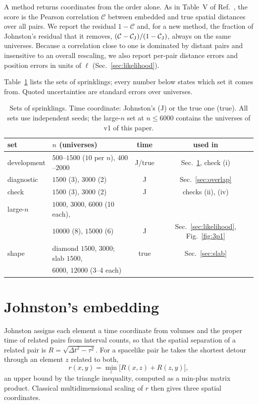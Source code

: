 \documentclass[prd,twocolumn,superscriptaddress,nofootinbib,amsmath,amssymb,floatfix]{revtex4-2}
\begin{document}
A method returns coordinates from the order alone. As in Table~V of Ref.~\cite{Johnston25}, the score is the Pearson correlation $\mathcal C$ between embedded and true spatial distances over all pairs. We report the residual $1-\mathcal C$ and, for a new method, the fraction of Johnston's residual that it removes, $(\mathcal C-\mathcal C_{\rm J})/(1-\mathcal C_{\rm J})$, always on the same universes. Because a correlation close to one is dominated by distant pairs and insensitive to an overall rescaling, we also report per-pair distance errors and position errors in units of $\ell$ (Sec.~\ref{sec:likelihood}).

Table~\ref{tab:sets} lists the sets of sprinklings; every number below states which set it comes from. Quoted uncertainties are standard errors over universes.

\begin{table}[t]
\caption{Sets of sprinklings. Time coordinate: Johnston's (J) or the true one (true). All sets use independent seeds; the large-$n$ set at $n\le6000$ contains the universes of v1 of this paper.}
\label{tab:sets}
\begin{ruledtabular}
\begin{tabular}{llcc}
set & $n$ (universes) & time & used in\\
\hline
development & $500$--$1500$ ($10$ per $n$), $400$--$2000$ & J/true & Sec.~\ref{sec:johnston}, check (i)\\
diagnostic & $1500$ (3), $3000$ (2) & J & Sec.~\ref{sec:overlap}\\
check & $1500$ (3), $3000$ (2) & J & checks (ii), (iv)\\
large-$n$ & $1000$, $3000$, $6000$ (10 each),\\
 & $10000$ (8), $15000$ (6) & J & Sec.~\ref{sec:likelihood}, Fig.~\ref{fig:3p1}\\
shape & diamond $1500$, $3000$; slab $1500$, & true & Sec.~\ref{sec:slab}\\
 & $6000$, $12000$ (3--4 each) & & \\
\end{tabular}
\end{ruledtabular}
\end{table}

\section{Johnston's embedding}\label{sec:johnston}
Johnston assigns each element a time coordinate from volumes and the proper time of related pairs from interval counts, so that the spatial separation of a related pair is $R=\sqrt{\Delta t^2-\tau^2}$. For a spacelike pair he takes the shortest detour through an element $z$ related to both,
\begin{equation}
r(x,y)=\min_z\big[R(x,z)+R(z,y)\big],
\label{eq:detour}
\end{equation}
an upper bound by the triangle inequality, computed as a min-plus matrix product. Classical multidimensional scaling of $r$ then gives three spatial coordinates.
\end{document}

